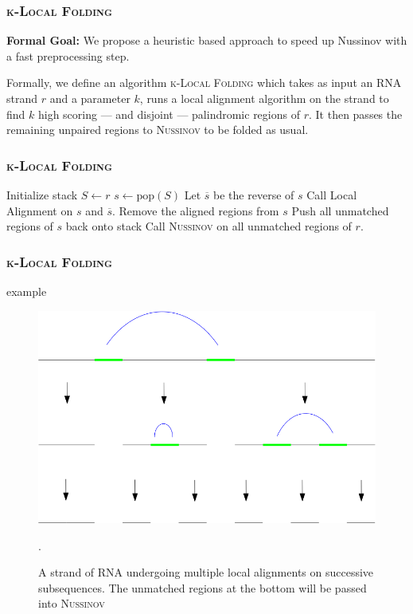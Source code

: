 \documentclass{beamer}
\newcommand{\klf}{\textsc{k-Local Folding}\xspace}
\newcommand{\rf}{\textsc{Nussinov}\xspace}
\newcommand{\s}{\vspace{1cm}}
\begin{document}
\begin{frame}
\frametitle{\klf}
\textbf{Formal Goal:} We propose a heuristic based approach to speed up Nussinov with a fast preprocessing step. \s

Formally, we define an algorithm \klf which takes as input an RNA strand $r$ and a parameter $k$, runs a local alignment algorithm on the strand to find $k$ high scoring --- and disjoint --- palindromic regions of $r$. It then passes the remaining unpaired regions to \rf to be folded as usual.
\end{frame}

\begin{frame}
\frametitle{\klf} 
\begin{algorithmic}[1]
\State Initialize stack $S\gets r$
\State $s\gets \text{pop}(S)$
\State Let $\overline{s}$ be the reverse of $s$
\State Call Local Alignment on $s$ and $\overline{s}$.
\State Remove the aligned regions from $s$
\State Push all unmatched regions of $s$ back onto stack
\EndIf 
\EndWhile
\State Call \rf on all unmatched regions of $r$. 
\EndProcedure
\end{algorithmic}
\end{frame}

\begin{frame}
\frametitle{\klf}
\begin{block}{example}
\begin{figure}
\centering
\includegraphics[scale=0.28]{images/k_local_sequence.png}
\caption{A strand of RNA undergoing multiple local alignments on successive subsequences. The unmatched regions at the bottom will be passed into \rf}. 
\end{figure}
\end{block}
\end{frame}
\end{document}
